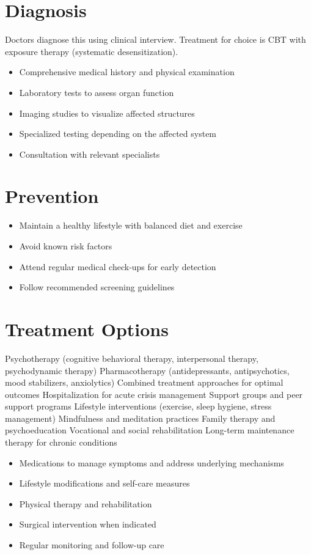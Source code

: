 \section{Diagnosis}
Doctors diagnose this using clinical interview. Treatment for choice is CBT with exposure therapy (systematic desensitization).

\begin{itemize}[noitemsep]
  \item Comprehensive medical history and physical examination
  \item Laboratory tests to assess organ function
  \item Imaging studies to visualize affected structures
  \item Specialized testing depending on the affected system
  \item Consultation with relevant specialists
\end{itemize}
\section{Prevention}
\begin{itemize}[noitemsep]
  \item Maintain a healthy lifestyle with balanced diet and exercise
  \item Avoid known risk factors
  \item Attend regular medical check-ups for early detection
  \item Follow recommended screening guidelines
\end{itemize}
\section{Treatment Options}
Psychotherapy (cognitive behavioral therapy, interpersonal therapy, psychodynamic therapy) Pharmacotherapy (antidepressants, antipsychotics, mood stabilizers, anxiolytics) Combined treatment approaches for optimal outcomes Hospitalization for acute crisis management Support groups and peer support programs Lifestyle interventions (exercise, sleep hygiene, stress management) Mindfulness and meditation practices Family therapy and psychoeducation Vocational and social rehabilitation Long-term maintenance therapy for chronic conditions

\begin{itemize}[noitemsep]
  \item Medications to manage symptoms and address underlying mechanisms
  \item Lifestyle modifications and self-care measures
  \item Physical therapy and rehabilitation
  \item Surgical intervention when indicated
  \item Regular monitoring and follow-up care
\end{itemize}
